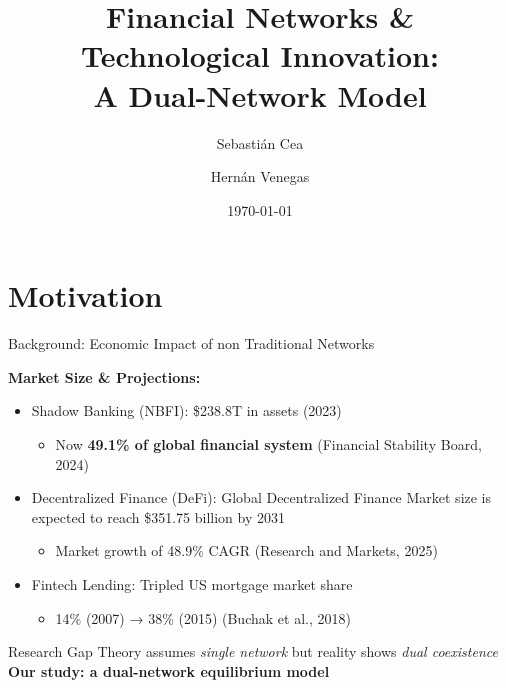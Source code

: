 \documentclass[aspectratio=169]{beamer}
\title[Financial Networks \& Alternative Infrastructure]{Financial Networks \& Technological Innovation:\\A Dual-Network Model}
\author{Sebastián Cea \and Hernán Venegas}
\institute{Universidad de Los Andes}
\date{\today}
\begin{document}
\frame{\titlepage}

\section{Motivation}

\begin{frame}{Background: Economic Impact of non Traditional Networks}

\textbf{Market Size \& Projections:}

\begin{itemize}
    \item \alert{Shadow Banking (NBFI)}: \$238.8T in assets (2023)
    \begin{itemize}
        \item[-] Now \textbf{49.1\% of global financial system} (Financial Stability Board, 2024)
    \end{itemize}
    
    \vspace{0.3cm}
    
    \item \alert{Decentralized Finance (DeFi)}: Global Decentralized Finance Market size is expected to reach \$351.75 billion by 2031
    \begin{itemize}
        \item[-] Market growth of 48.9\% CAGR (Research and Markets, 2025)
    \end{itemize}
    
    \vspace{0.3cm}
    
    \item \alert{Fintech Lending}: Tripled US mortgage market share
    \begin{itemize}
        \item[-] 14\% (2007) → 38\% (2015) (Buchak et al., 2018)
    \end{itemize}
\end{itemize}

\vspace{0.4cm}

\begin{alertblock}{Research Gap}
\centering
Theory assumes \textit{single network} but reality shows \textit{dual coexistence}\\
\textbf{Our study: a dual-network equilibrium model}
\end{alertblock}

\end{frame}
\end{document}
